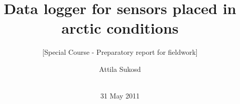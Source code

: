 \documentclass{project}
\begin{document}
\title{Data logger for sensors placed in arctic conditions}
\subtitle{[Special Course - Preparatory report for fieldwork]}

%
%
%
%
%

%
\author{
%
%
\alignauthor
Attila Sukosd\\
       \\
}
\date{31 May 2011}
\end{document}
